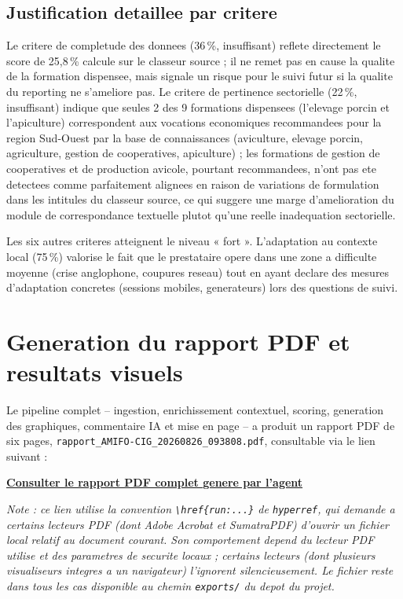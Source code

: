 \documentclass[12pt,a4paper,twoside,openany]{report}
\begin{document}
\subsection{Justification detaillee par critere}
\label{sec:justif_criteres}

Le critere de completude des donnees (36\,\%, insuffisant) reflete directement le score de 25,8\,\% calcule sur le classeur source ; il ne remet pas en cause la qualite de la formation dispensee, mais signale un risque pour le suivi futur si la qualite du reporting ne s'ameliore pas. Le critere de pertinence sectorielle (22\,\%, insuffisant) indique que seules 2 des 9 formations dispensees (l'elevage porcin et l'apiculture) correspondent aux vocations economiques recommandees pour la region Sud-Ouest par la base de connaissances (aviculture, elevage porcin, agriculture, gestion de cooperatives, apiculture) ; les formations de gestion de cooperatives et de production avicole, pourtant recommandees, n'ont pas ete detectees comme parfaitement alignees en raison de variations de formulation dans les intitules du classeur source, ce qui suggere une marge d'amelioration du module de correspondance textuelle plutot qu'une reelle inadequation sectorielle.

Les six autres criteres atteignent le niveau « fort ». L'adaptation au contexte local (75\,\%) valorise le fait que le prestataire opere dans une zone a difficulte moyenne (crise anglophone, coupures reseau) tout en ayant declare des mesures d'adaptation concretes (sessions mobiles, generateurs) lors des questions de suivi.

\section{Generation du rapport PDF et resultats visuels}

Le pipeline complet -- ingestion, enrichissement contextuel, scoring, generation des graphiques, commentaire IA et mise en page -- a produit un rapport PDF de six pages, \texttt{rapport\_AMIFO-CIG\_20260826\_093808.pdf}, consultable via le lien suivant :

\begin{center}
\href{run:../exports/rapport_AMIFO-CIG_20260826_093808.pdf}{\textbf{Consulter le rapport PDF complet genere par l'agent}}
\end{center}

\textit{Note : ce lien utilise la convention \texttt{\textbackslash href\{run:...\}} de \texttt{hyperref}, qui demande a certains lecteurs PDF (dont Adobe Acrobat et SumatraPDF) d'ouvrir un fichier local relatif au document courant. Son comportement depend du lecteur PDF utilise et des parametres de securite locaux ; certains lecteurs (dont plusieurs visualiseurs integres a un navigateur) l'ignorent silencieusement. Le fichier reste dans tous les cas disponible au chemin \texttt{exports/} du depot du projet.}
\end{document}
